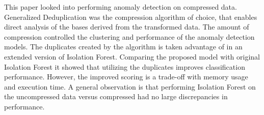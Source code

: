 This paper looked into performing anomaly detection on compressed data. Generalized Deduplication was the compression algorithm of choice, that enables direct analysis of the bases derived from the transformed data. The amount of compression controlled the clustering and performance of the anomaly detection models. The duplicates created by the algorithm is taken advantage of in an extended version of Isolation Forest. Comparing the proposed model with original Isolation Forest it showed that utilizing the duplicates improves classification performance. However, the improved scoring is a trade-off with memory usage and execution time. A general observation is that performing Isolation Forest on the uncompressed data versus compressed had no large discrepancies in performance.    